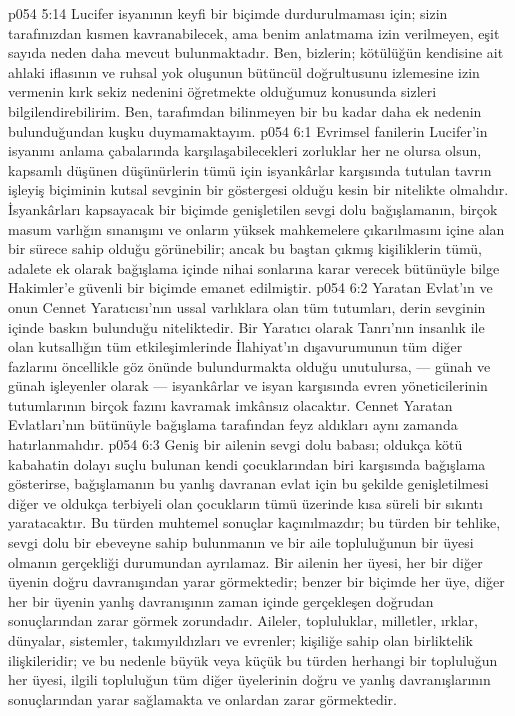 \vs p054 5:14 Lucifer isyanının keyfi bir biçimde durdurulmaması için; sizin tarafınızdan kısmen kavranabilecek, ama benim anlatmama izin verilmeyen, eşit sayıda neden daha mevcut bulunmaktadır. Ben, bizlerin; kötülüğün kendisine ait ahlaki iflasının ve ruhsal yok oluşunun bütüncül doğrultusunu izlemesine izin vermenin kırk sekiz nedenini öğretmekte olduğumuz konusunda sizleri bilgilendirebilirim. Ben, tarafımdan bilinmeyen bir bu kadar daha ek nedenin bulunduğundan kuşku duymamaktayım.
\vs p054 6:1 Evrimsel fanilerin Lucifer’in isyanını anlama çabalarında karşılaşabilecekleri zorluklar her ne olursa olsun, kapsamlı düşünen düşünürlerin tümü için isyankârlar karşısında tutulan tavrın işleyiş biçiminin kutsal sevginin bir göstergesi olduğu kesin bir nitelikte olmalıdır. İsyankârları kapsayacak bir biçimde genişletilen sevgi dolu bağışlamanın, birçok masum varlığın sınanışını ve onların yüksek mahkemelere çıkarılmasını içine alan bir sürece sahip olduğu görünebilir; ancak bu baştan çıkmış kişiliklerin tümü, adalete ek olarak bağışlama içinde nihai sonlarına karar verecek bütünüyle bilge Hakimler’e güvenli bir biçimde emanet edilmiştir.
\vs p054 6:2 Yaratan Evlat’ın ve onun Cennet Yaratıcısı’nın ussal varlıklara olan tüm tutumları, derin sevginin içinde baskın bulunduğu niteliktedir. Bir Yaratıcı olarak Tanrı’nın insanlık ile olan kutsallığın tüm etkileşimlerinde İlahiyat’ın dışavurumunun tüm diğer fazlarını öncellikle göz önünde bulundurmakta olduğu unutulursa, --- günah ve günah işleyenler olarak --- isyankârlar ve isyan karşısında evren yöneticilerinin tutumlarının birçok fazını kavramak imkânsız olacaktır. Cennet Yaratan Evlatları’nın bütünüyle bağışlama tarafından feyz aldıkları aynı zamanda hatırlanmalıdır.
\vs p054 6:3 Geniş bir ailenin sevgi dolu babası; oldukça kötü kabahatin dolayı suçlu bulunan kendi çocuklarından biri karşısında bağışlama gösterirse, bağışlamanın bu yanlış davranan evlat için bu şekilde genişletilmesi diğer ve oldukça terbiyeli olan çocukların tümü üzerinde kısa süreli bir sıkıntı yaratacaktır. Bu türden muhtemel sonuçlar kaçınılmazdır; bu türden bir tehlike, sevgi dolu bir ebeveyne sahip bulunmanın ve bir aile topluluğunun bir üyesi olmanın gerçekliği durumundan ayrılamaz. Bir ailenin her üyesi, her bir diğer üyenin doğru davranışından yarar görmektedir; benzer bir biçimde her üye, diğer her bir üyenin yanlış davranışının zaman içinde gerçekleşen doğrudan sonuçlarından zarar görmek zorundadır. Aileler, topluluklar, milletler, ırklar, dünyalar, sistemler, takımyıldızları ve evrenler; kişiliğe sahip olan birliktelik ilişkileridir; ve bu nedenle büyük veya küçük bu türden herhangi bir topluluğun her üyesi, ilgili topluluğun tüm diğer üyelerinin doğru ve yanlış davranışlarının sonuçlarından yarar sağlamakta ve onlardan zarar görmektedir.

